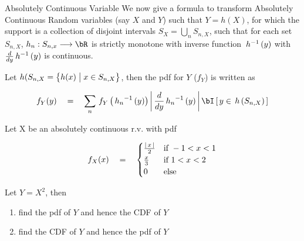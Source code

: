 \documentclass{article}
\begin{document}
\begin{ssection}{Absolutely Continuous Variable}
	We now give a formula to transform Absolutely Continuous Random variables (say $X$ and $Y$) such that $Y = h(X)$, for which the support is a collection of disjoint intervals $S_X = \bigcup_{n} S_{n, X}$, such that for each set $S_{n, X}$, $h_n : S_{n, x} \lra \bR$ is strictly monotone with inverse function $\funcinv{h}{y}$ with $\ders{y} \funcinv{h}{y}$ is continuous. \br
	
	Let $h(S_{n, X} = \left\{ {h(x) \;\big|\; x \in S_{n, X}} \right\}$, then the pdf for $Y$ ($f_Y$) is written as

	\begin{align*}
		f_Y(y)	\eq	\sum_{n} \func[Y]{f}{\funcinv{h_n}{y}} \abs{\ders{y} \funcinv{h_n}{y}} \is{y \in \func{h}{S_{n, X}}}
	\end{align*}

	\begin{exercise}
		Let X be an absolutely continuous r.v. with pdf

		\begin{align*}
			f_X(x)	\quad = \quad	\begin{cases}
				\frac{\left| \,{x}\, \right|}{2}	&	\text{if}\,\, -1 < x < 1 \\
				\frac{x}{3}			&	\text{if}\,\,	1 < x < 2 \\
				0					&	\text{else}\,\,
			\end{cases}
		\end{align*}

		Let $Y = X^2$, then

		\begin{enumerate}[label=(\roman*)]
			\item find the pdf of $Y$ and hence the CDF of $Y$
			\item find the CDF of $Y$ and hence the pdf of $Y$
		\end{enumerate}
	\end{exercise}
\end{ssection}
\end{document}
